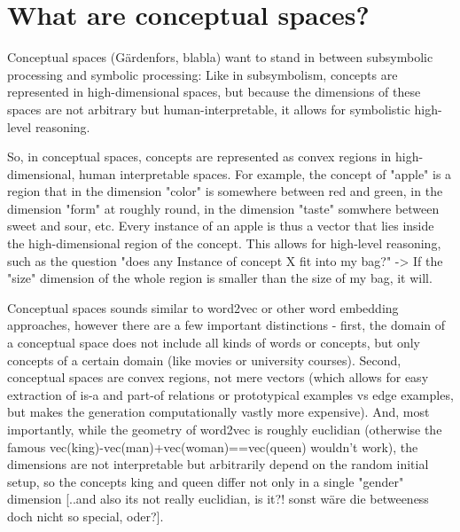 \documentclass[11pt,
  paper=a4, 
  twoside,  %
  hidelinks,
  bibliography=totocnumbered,
	captions=tableheading,
	BCOR=10mm
]{scrreprt}
\theoremstyle{definition}
\begin{document}
\section{What are conceptual spaces? }

Conceptual spaces (Gärdenfors, blabla) want to stand in between subsymbolic processing and symbolic processing: Like in subsymbolism, concepts are represented in high-dimensional spaces, but because the dimensions of these spaces are not arbitrary but human-interpretable, it allows for symbolistic high-level reasoning.

So, in conceptual spaces, concepts are represented as convex regions in high-dimensional, human interpretable spaces. For example, the concept of "apple" is a region that in the dimension "color" is somewhere between red and green, in the dimension "form" at roughly round, in the dimension "taste" somwhere between sweet and sour, etc. 
Every instance of an apple is thus a vector that lies inside the high-dimensional region of the concept. This allows for high-level reasoning, such as the question "does any Instance of concept X fit into my bag?" -> If the "size" dimension of the whole region is smaller than the size of my bag, it will.

Conceptual spaces sounds similar to word2vec or other word embedding approaches, however there are a few important distinctions - first, the domain of a conceptual space does not include all kinds of words or concepts, but only concepts of a certain domain (like movies or university courses). 
Second, conceptual spaces are convex regions, not mere vectors (which allows for easy extraction of is-a and part-of relations or prototypical examples vs edge examples, but makes the generation computationally vastly more expensive). And, most importantly, while the geometry of word2vec is roughly euclidian (otherwise the famous vec(king)-vec(man)+vec(woman)==vec(queen) wouldn't work), the dimensions are not interpretable but arbitrarily depend on the random initial setup, so the concepts king and queen differ not only in a single "gender" dimension [..and also its not really euclidian, is it?! sonst wäre die betweeness doch nicht so special, oder?].
\end{document}
